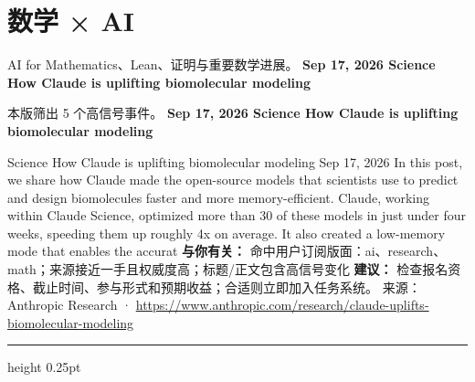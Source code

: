 \documentclass[10.5pt]{ctexart}
\begin{document}
\section*{数学 × AI}
{\color{ormuted} AI for Mathematics、Lean、证明与重要数学进展。}
\vspace{2mm}
{\LARGE\bfseries Sep 17, 2026 Science How Claude is uplifting biomolecular modeling}\par
\vspace{1mm}
{\color{ormuted} 本版筛出 5 个高信号事件。}
\vspace{3mm}
{\Large\bfseries Sep 17, 2026 Science How Claude is uplifting biomolecular modeling}\par
Science How Claude is uplifting biomolecular modeling Sep 17, 2026 In this post, we share how Claude made the open-source models that scientists use to predict and design biomolecules faster and more memory-efficient. Claude, working within Claude Science, optimized more than 30 of these models in just under four weeks, speeding them up roughly 4x on average. It also created a low-memory mode that enables the accurat
\textbf{与你有关：} 命中用户订阅版面：ai、research、math；来源接近一手且权威度高；标题/正文包含高信号变化
\textbf{建议：} 检查报名资格、截止时间、参与形式和预期收益；合适则立即加入任务系统。
{\footnotesize\color{ormuted} 来源：Anthropic Research · \url{https://www.anthropic.com/research/claude-uplifts-biomolecular-modeling}}
\vspace{4mm}
\hrule height 0.25pt
\vspace{3mm}
\end{document}
